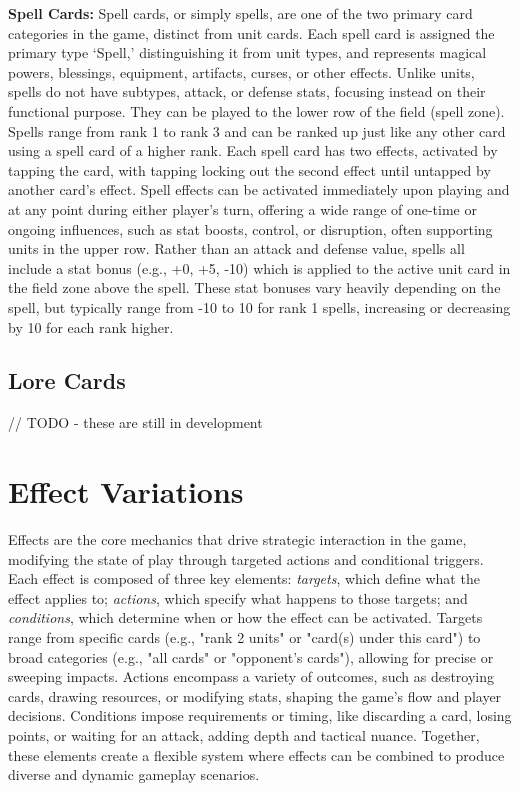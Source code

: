\textbf{Spell Cards:} Spell cards, or simply spells, are one of the two primary card categories in the game, distinct from unit cards. Each spell card is assigned the primary type `Spell,' distinguishing it from unit types, and represents magical powers, blessings, equipment, artifacts, curses, or other effects. Unlike units, spells do not have subtypes, attack, or defense stats, focusing instead on their functional purpose. They can be played to the lower row of the field (spell zone). Spells range from rank 1 to rank 3 and can be ranked up just like any other card using a spell card of a higher rank. Each spell card has two effects, activated by tapping the card, with tapping locking out the second effect until untapped by another card’s effect. Spell effects can be activated immediately upon playing and at any point during either player’s turn, offering a wide range of one-time or ongoing influences, such as stat boosts, control, or disruption, often supporting units in the upper row. Rather than an attack and defense value, spells all include a stat bonus (e.g., +0, +5, -10) which is applied to the active unit card in the field zone above the spell. These stat bonuses vary heavily depending on the spell, but typically range from -10 to 10 for rank 1 spells, increasing or decreasing by 10 for each rank higher.


\subsection{Lore Cards}
// TODO - these are still in development







\section{Effect Variations}
Effects are the core mechanics that drive strategic interaction in the game, modifying the state of play through targeted actions and conditional triggers. Each effect is composed of three key elements: \textit{targets}, which define what the effect applies to; \textit{actions}, which specify what happens to those targets; and \textit{conditions}, which determine when or how the effect can be activated. Targets range from specific cards (e.g., "rank 2 units" or "card(s) under this card") to broad categories (e.g., "all cards" or "opponent’s cards"), allowing for precise or sweeping impacts. Actions encompass a variety of outcomes, such as destroying cards, drawing resources, or modifying stats, shaping the game’s flow and player decisions. Conditions impose requirements or timing, like discarding a card, losing points, or waiting for an attack, adding depth and tactical nuance. Together, these elements create a flexible system where effects can be combined to produce diverse and dynamic gameplay scenarios.


